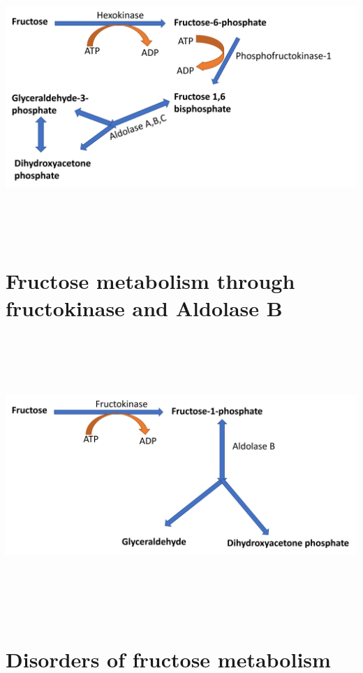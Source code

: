 \documentclass[
]{book}
\begin{document}
\includegraphics[width=\textwidth,height=4.16667in]{Images/Fructose1.png}

\section{Fructose metabolism through fructokinase and Aldolase B}\label{fructose-metabolism-through-fructokinase-and-aldolase-b}

\includegraphics[width=\textwidth,height=4.16667in]{Images/Fructose2.png}

\section{Disorders of fructose metabolism}\label{disorders-of-fructose-metabolism}
\end{document}
